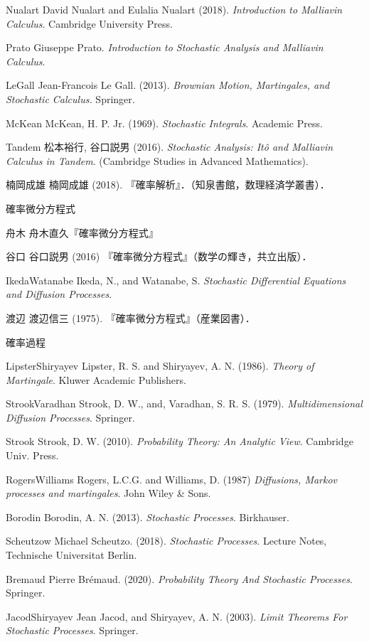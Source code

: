 \documentclass[uplatex,dvipdfmx]{jsreport}
\begin{document}

\begin{thebibliography}{99}
    \item{Nualart}%
    David Nualart and Eulalia Nualart (2018). \textit{Introduction to Malliavin Calculus}. Cambridge University Press.
    \item{Prato}%
    Giuseppe Prato. \textit{Introduction to Stochastic Analysis and Malliavin Calculus}.
    \item{LeGall}%
    Jean-Francois Le Gall. (2013). \textit{Brownian Motion, Martingales, and Stochastic Calculus.} Springer.
    \item{McKean}%
    McKean, H. P. Jr. (1969). \textit{Stochastic Integrals}. Academic Press.
    \item{Tandem}
    松本裕行, 谷口説男 (2016). \textit{Stochastic Analysis: Itô and Malliavin Calculus in Tandem}. (Cambridge Studies in Advanced Mathematics).
    \item{楠岡成雄}
    楠岡成雄 (2018). 『確率解析』．（知泉書館，数理経済学叢書）．

    確率微分方程式
    \item{舟木}
    舟木直久『確率微分方程式』
    \item{谷口}
    谷口説男 (2016) 『確率微分方程式』（数学の輝き，共立出版）．
    \item{IkedaWatanabe}
    Ikeda, N., and Watanabe, S. \textit{Stochastic Differential Equations and Diffusion Processes}.
    \item{渡辺}
    渡辺信三 (1975). 『確率微分方程式』（産業図書）．

    確率過程
    \item{LipsterShiryayev}
    Lipster, R. S. and Shiryayev, A. N. (1986). \textit{Theory of Martingale}. Kluwer Academic Publishers.
    \item{StrookVaradhan}
    Strook, D. W., and, Varadhan, S. R. S. (1979). \textit{Multidimensional Diffusion Processes}. Springer.
    \item{Strook}
    Strook, D. W. (2010). \textit{Probability Theory: An Analytic View}. Cambridge Univ. Press.
    \item{RogersWilliams}
    Rogers, L.C.G. and Williams, D. (1987) \textit{Diffusions, Markov processes and martingales}. John Wiley \& Sons.
    \item{Borodin}
    Borodin, A. N. (2013). \textit{Stochastic Processes}. Birkhauser.
    \item{Scheutzow}
    Michael Scheutzo. (2018). \textit{Stochastic Processes}. Lecture Notes, Technische Universitat Berlin.
    \item{Bremaud}
    Pierre Brémaud. (2020). \textit{Probability Theory And Stochastic Processes}. Springer.
    \item{JacodShiryayev}
    Jean Jacod, and Shiryayev, A. N. (2003). \textit{Limit Theorems For Stochastic Processes}. Springer.


\end{thebibliography}
\end{document}
